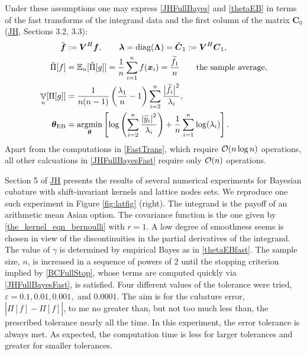\documentclass[sts]{imsart}
\numberwithin{equation}{section}
\theoremstyle{plain}
\newcommand{\vC}{\boldsymbol{C}}
\DeclareMathOperator{\Var}{\mathbb{V}}
\newcommand{\JH}{\hyperlink{RatHic18a}{JH}\xspace}
\newcommand{\vLambda}{\boldsymbol{\Lambda}}
\begin{document}
Under these assumptions one may express \eqref{JHFullBayes} and \eqref{thetaEB} in terms of the fast transforms of the integrand data and the first column of the matrix $\vC_0$ (\JH, Sections 3.2, 3.3):
\begin{subequations} \label{JHFullBayesFast}
\begin{align}
\label{FastTrans}
\tvf & : = \vV^{H} \vf, \qquad \vlambda = \diag(\vLambda) = \tilde{\vC}_1 := \vV^{H} \vC_1, \\
    \hat{\Pi}[f] & =  \Ex_n[\hat{\Pi}[g]] = \frac 1n \sum_{i=1}^n f(\vx_i) = \frac{\tf_1}{n} \qquad \text{the sample average},\\
\Var_n[\Pi[g]] & = \frac{1}{n(n-1)} \left(\frac{\lambda_1}{n}  - 1  \right)\sum_{i=2}^n \frac{\bigl \lvert \tf_i\bigr \rvert^2}{\lambda_i} , \\
\label{thetaEBfast}
\vtheta_{\textup{EB}} &= 
\argmin_{\vtheta}
\left[
\log\left(
\sum_{i=2}^n \frac{\abs{\widetilde{y}_i}^2}{\lambda_i}
\right)  
  + 
\frac{1}{n}\sum_{i=1}^n \log(\lambda_i)
\right].
\end{align}
\end{subequations}
Apart from the computations in \eqref{FastTrans}, which require $\operatorname{{\mathcal O}}(n \log n)$ operations, all other calcuations in \eqref{JHFullBayesFast} require only $\operatorname{{\mathcal O}}(n)$ operations.

Section 5 of \JH presents the results of several numerical experiments for Bayesian cubature with shift-invariant kernels and lattice nodes sets.  We reproduce one such experiment in Figure \ref{fig:latfig} (right).  The integrand is the payoff of an arithmetic mean Asian option.  The covariance function is the one given by \eqref{the_kernel_eqn_bernoulli} with $r=1$.  A low degree of smoothness seems is chosen in view of the discontinuities in the partial derivatives of the integrand.  The value of $\gamma$ is determined by empirical Bayes as in \eqref{thetaEBfast}.  The sample size, $n$, is increased in a sequence of powers of $2$ until the stopping criterion implied by \eqref{BCFullStop}, whose terms are computed quickly via \eqref{JHFullBayesFast}, is satisfied.  Four different values of the tolerance were tried, $\varepsilon = 0.1, 0.01, 0.001,$ and $0.0001$. The aim is for the cubature error, $|\Pi[f] - \hat{\Pi}[f]|$, to me no greater than, but not too much less than, the prescribed tolerance nearly all the time.  In this experiment, the error tolerance is always met.  As expected, the computation time is less for larger tolerances and greater for smaller tolerances.  
\end{document}
